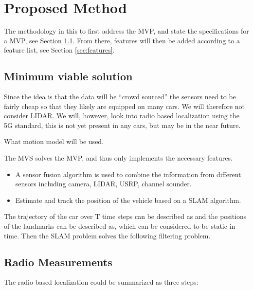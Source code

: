 \section{Proposed Method}

The methodology in this to first address the \gls{MVP}, and state the  
specifications for a \gls{MVP}, see Section \ref{sec:mvs}. From there, features 
will then be added 
according to a feature list, see Section \ref{sec:features}.

\subsection{Minimum viable solution}\label{sec:mvs}

Since the idea is that the data will be “crowd sourced” the sensors
need to be fairly cheap so that they likely are equipped on many
cars. We will therefore not consider \gls{LIDAR}. We will, however, look
into radio based localization using the 5G standard, this is not yet
present in any cars, but may be in the near future.

What motion model will be used. 

The \gls{MVS} solves the \gls{MVP}, and thus only implements the necessary
features.
\begin{itemize}
\item A sensor fusion algorithm is used to combine the information
  from different sensors including camera, LIDAR, USRP, channel
  sounder.
\item Estimate and track the position of the vehicle based on a SLAM
  algorithm.
\end{itemize}

The trajectory of the car over T time steps can be described as and
the positions of the landmarks can be described as, which can be
considered to be static in time. Then the \gls{SLAM} problem solves
the following filtering problem.

\subsection{Radio Measurements}\label{sec:radio_measurements}

The radio based localization could be summarized as three steps:

